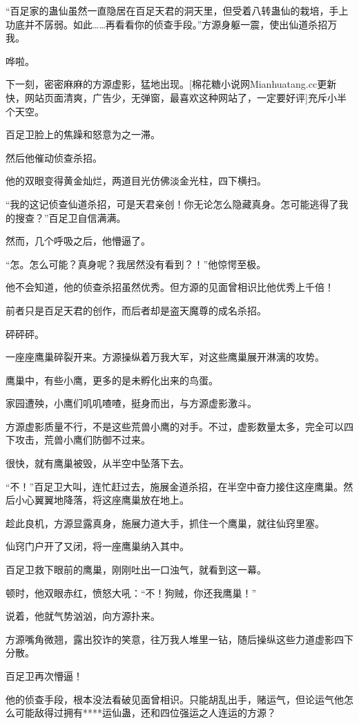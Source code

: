 \begin{this_body}
“百足家的蛊仙虽然一直隐居在百足天君的洞天里，但受着八转蛊仙的栽培，手上功底并不孱弱。如此……再看看你的侦查手段。”方源身躯一震，使出仙道杀招万我。

哗啦。

下一刻，密密麻麻的方源虚影，猛地出现。[棉花糖小说网Mianhuatang.cc更新快，网站页面清爽，广告少，无弹窗，最喜欢这种网站了，一定要好评]充斥小半个天空。

百足卫脸上的焦躁和怒意为之一滞。

然后他催动侦查杀招。

他的双眼变得黄金灿烂，两道目光仿佛淡金光柱，四下横扫。

“我的这记侦查仙道杀招，可是天君亲创！你无论怎么隐藏真身。怎可能逃得了我的搜查？”百足卫自信满满。

然而，几个呼吸之后，他懵逼了。

“怎。怎么可能？真身呢？我居然没有看到？！”他惊愕至极。

他不会知道，他的侦查杀招虽然优秀。但方源的见面曾相识比他优秀上千倍！

前者只是百足天君的创作，而后者却是盗天魔尊的成名杀招。

砰砰砰。

一座座鹰巢碎裂开来。方源操纵着万我大军，对这些鹰巢展开淋漓的攻势。

鹰巢中，有些小鹰，更多的是未孵化出来的鸟蛋。

家园遭殃，小鹰们叽叽喳喳，挺身而出，与方源虚影激斗。

方源虚影质量不行，不是这些荒兽小鹰的对手。不过，虚影数量太多，完全可以四下攻击，荒兽小鹰们防御不过来。

很快，就有鹰巢被毁，从半空中坠落下去。

“不！”百足卫大叫，连忙赶过去，施展金道杀招，在半空中奋力接住这座鹰巢。然后小心翼翼地降落，将这座鹰巢放在地上。

趁此良机，方源显露真身，施展力道大手，抓住一个鹰巢，就往仙窍里塞。

仙窍门户开了又闭，将一座鹰巢纳入其中。

百足卫救下眼前的鹰巢，刚刚吐出一口浊气，就看到这一幕。

顿时，他双眼赤红，愤怒大吼：“不！狗贼，你还我鹰巢！”

说着，他就气势汹汹，向方源扑来。

方源嘴角微翘，露出狡诈的笑意，往万我人堆里一钻，随后操纵这些力道虚影四下分散。

百足卫再次懵逼！

他的侦查手段，根本没法看破见面曾相识。只能胡乱出手，赌运气，但论运气他怎么可能敌得过拥有****运仙蛊，还和四位强运之人连运的方源？


\end{this_body}
